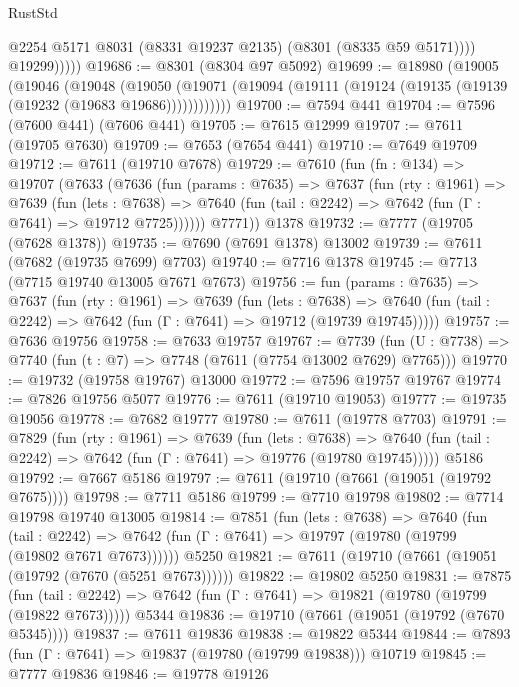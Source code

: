 \begin{lexlean}{RustStd}
\begin{coremodule}
                  @2254
                  @5171
                  @8031
                  (@8331 @19237 @2135)
                  (@8301 (@8335 @59 @5171))))
              @19299)))))
@19686 := @8301 (@8304 @97 @5092)
@19699 := @18980
    (@19005
      (@19046
        (@19048
          (@19050 (@19071 (@19094 (@19111 (@19124 (@19135 (@19139 (@19232 (@19683 @19686))))))))))))
@19700 := @7594 @441
@19704 := @7596 (@7600 @441) (@7606 @441)
@19705 := @7615 @12999
@19707 := @7611 (@19705 @7630)
@19709 := @7653 (@7654 @441)
@19710 := @7649 @19709
@19712 := @7611 (@19710 @7678)
@19729 := @7610
    (fun (fn : @134) =>
    @19707
      (@7633
        (@7636
          (fun (params : @7635) =>
          @7637
            (fun (rty : @1961) =>
            @7639
              (fun (lets : @7638) =>
              @7640 (fun (tail : @2242) => @7642 (fun (Γ : @7641) => @19712 @7725))))))
        @7771))
    @1378
@19732 := @7777 (@19705 (@7628 @1378))
@19735 := @7690 (@7691 @1378) @13002
@19739 := @7611 (@7682 (@19735 @7699) @7703)
@19740 := @7716 @1378
@19745 := @7713 (@7715 @19740 @13005 @7671 @7673)
@19756 := fun (params : @7635) =>
  @7637
    (fun (rty : @1961) =>
    @7639
      (fun (lets : @7638) =>
      @7640 (fun (tail : @2242) => @7642 (fun (Γ : @7641) => @19712 (@19739 @19745)))))
@19757 := @7636 @19756
@19758 := @7633 @19757
@19767 := @7739
    (fun (U : @7738) => @7740 (fun (t : @7) => @7748 (@7611 (@7754 @13002 @7629) @7765)))
@19770 := @19732 (@19758 @19767) @13000
@19772 := @7596 @19757 @19767
@19774 := @7826 @19756 @5077
@19776 := @7611 (@19710 @19053)
@19777 := @19735 @19056
@19778 := @7682 @19777
@19780 := @7611 (@19778 @7703)
@19791 := @7829
    (fun (rty : @1961) =>
    @7639
      (fun (lets : @7638) =>
      @7640 (fun (tail : @2242) => @7642 (fun (Γ : @7641) => @19776 (@19780 @19745)))))
    @5186
@19792 := @7667 @5186
@19797 := @7611 (@19710 (@7661 (@19051 (@19792 @7675))))
@19798 := @7711 @5186
@19799 := @7710 @19798
@19802 := @7714 @19798 @19740 @13005
@19814 := @7851
    (fun (lets : @7638) =>
    @7640
      (fun (tail : @2242) =>
      @7642 (fun (Γ : @7641) => @19797 (@19780 (@19799 (@19802 @7671 @7673))))))
    @5250
@19821 := @7611 (@19710 (@7661 (@19051 (@19792 (@7670 (@5251 @7673))))))
@19822 := @19802 @5250
@19831 := @7875
    (fun (tail : @2242) => @7642 (fun (Γ : @7641) => @19821 (@19780 (@19799 (@19822 @7673)))))
    @5344
@19836 := @19710 (@7661 (@19051 (@19792 (@7670 @5345))))
@19837 := @7611 @19836
@19838 := @19822 @5344
@19844 := @7893 (fun (Γ : @7641) => @19837 (@19780 (@19799 @19838))) @10719
@19845 := @7777 @19836
@19846 := @19778 @19126

\end{coremodule}
\end{lexlean}
